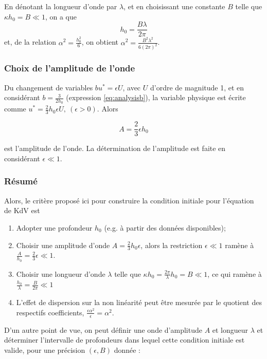 \indent En dénotant la longueur d'onde par $\lambda$, et en choisissant une constante $B$ telle que $\kappa h_0  =  B \ll 1$, on a que $$h_0 = \frac{B\lambda}{2\pi}$$ et, de la relation $\alpha^2 = \frac{h_0^2}{6}$, on obtient $\alpha^2 = \frac{B^2\lambda^2}{6(2\pi)^2}$.

\subsubsection{Choix de l'amplitude de l'onde}

\indent Du changement de variables $bu^* = \epsilon U$, avec $U$ d'ordre de magnitude 1, et en considérant $b = \frac{3}{2h_0}$ (expression \ref{eq:analysisb}), la variable physique est écrite comme $u^* = \frac{2}{3}h_0\epsilon U, \ (\epsilon > 0)$. Alors

\begin{equation*}
A = \frac{2}{3}\epsilon h_0
\end{equation*}

\noindent est l'amplitude de l'onde. La détermination de l'amplitude est faite en considérant $\epsilon \ll 1$. 

\subsubsection{Résumé}

\indent Alors, le critère proposé ici pour construire la condition initiale pour l'équation de KdV est 

\begin{enumerate}
\item Adopter une profondeur $h_0$ (e.g. à partir des données disponibles);
\item Choisir une amplitude d'onde $A = \frac{2}{3}h_0\epsilon$, alors la restriction $\epsilon \ll 1$ ramène à $\frac{A}{h_0} = \frac{2}{3}\epsilon \ll 1$.
\item Choisir une longueur d'onde $\lambda$ telle que $\kappa h_0 = \frac{2\pi}{\lambda}h_0 = B \ll 1$, ce qui ramène à $\frac{h_0}{\lambda} = \frac{B}{2\pi} \ll 1$
\item L'effet de dispersion sur la non linéarité peut être mesurée par le quotient des respectifs coefficients, $\frac{\epsilon \alpha^2}{\epsilon} = \alpha^2$.
\end{enumerate}

\indent D'un autre point de vue, on peut définir une onde d'amplitude  $A$ et longueur $\lambda$ et déterminer l'intervalle de profondeurs dans lequel cette condition initiale est valide, pour une précision $(\epsilon,B)$ donnée :

